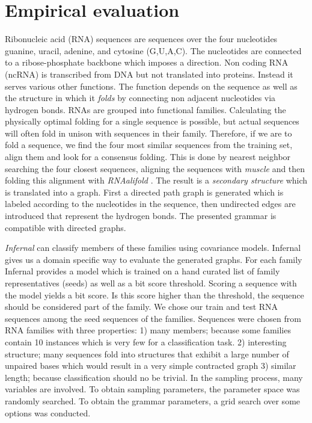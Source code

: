 \documentclass{article}
\begin{document}
\section{Empirical evaluation}

Ribonucleic acid (RNA) sequences are sequences over the four nucleotides guanine,
uracil, adenine, and cytosine (G,U,A,C).
The nucleotides are connected to a ribose-phosphate backbone which imposes a
direction. Non coding RNA (ncRNA) is transcribed from DNA but not
translated into proteins. Instead it serves various other functions.
The function depends on the sequence as well as the structure in which it 
\emph{folds} by connecting non adjacent nucleotides via hydrogen bonds. 
RNAs are grouped into functional families\cite{rfam}.
Calculating the physically optimal folding for a single sequence
is possible, but actual sequences will often fold in unison with 
sequences in their family. Therefore, if we are to fold a sequence,
we find the four most similar sequences from the training set, align them  and 
look for a consensus folding.
This is done by nearest neighbor searching the four closest sequences, 
aligning the sequences with \emph{muscle} \cite{muscle}
and then folding this alignment with \emph{RNAalifold}
\cite{rnaalifold}.  
The result is a \emph{secondary structure} which is translated into a 
graph. First a directed path graph is generated which is labeled
according to the nucleotides in the sequence, then undirected edges 
are introduced that represent the hydrogen bonds.
The presented grammar is compatible with directed graphs.

\emph{Infernal}\cite{infernal} can classify members of these families using
covariance models. Infernal gives us a domain specific way to evaluate
the generated graphs. 
For each family Infernal provides a model which is trained on 
a hand curated list of family representatives (seeds) as well as a 
bit score threshold. Scoring a sequence with the model yields a bit score.
Is this score higher than the threshold, the sequence should be considered 
part of the family. 
We chose our train and test RNA sequences among the seed sequences of the 
families. 
Sequences were chosen from RNA families with three properties:
1) many members; because some families contain 10
instances which is very few for a classification task. 2)  interesting 
structure; many sequences fold into structures that exhibit a large number of 
unpaired bases which would result in a very simple contracted graph
3) similar length; because classification should no be trivial.
In the sampling process, many variables are involved.
To obtain 
sampling parameters, the parameter space was randomly searched.
To obtain the grammar parameters, a grid search over some options was conducted.
\end{document}
